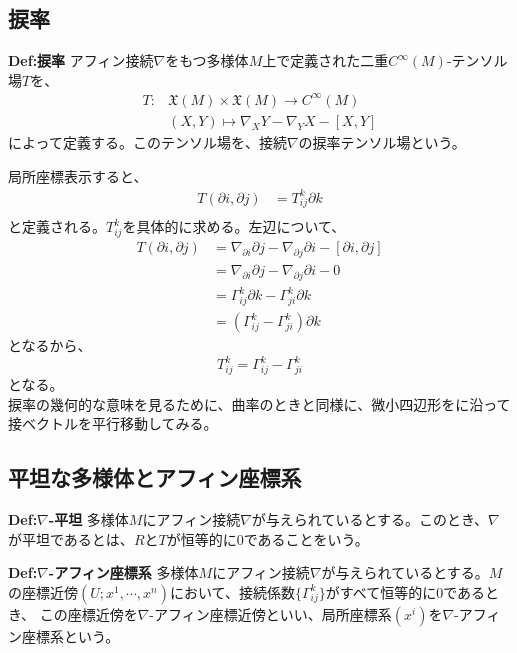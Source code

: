 \documentclass[a4paper,11pt]{jsarticle}
\numberwithin{equation}{section}
\begin{document}
\subsection{捩率}
\begin{itembox}[l]{\textbf{Def:捩率}}
    アフィン接続$\nabla$をもつ多様体$M$上で定義された二重$C^\infty(M)$-テンソル場$T$を、
    \begin{align}
        T : &\mathfrak{X}(M) \times \mathfrak{X}(M) \to C^\infty(M) \\
        & (X,Y) \mapsto \nabla_XY - \nabla_YX - [X,Y]
    \end{align}
    によって定義する。このテンソル場を、接続$\nabla$の捩率テンソル場という。
\end{itembox}
局所座標表示すると、
\begin{align}
    T(\partial{i},\partial{j}) &= T_{ij}^k\partial{k}\\
\end{align}
と定義される。$T_{ij}^k$を具体的に求める。左辺について、
\begin{align}
    T(\partial{i},\partial{j}) &= \nabla_{\partial{i}}\partial{j} - \nabla_{\partial{j}}\partial{i} - [\partial{i},\partial{j}]\\
    &= \nabla_{\partial{i}}\partial{j} - \nabla_{\partial{j}}\partial{i} - 0\\
    &= \Gamma_{ij}^k\partial{k} - \Gamma_{ji}^k\partial{k}\\
    &= (\Gamma_{ij}^k - \Gamma_{ji}^k)\partial{k}
\end{align}
となるから、
\begin{equation}
    T_{ij}^k = \Gamma_{ij}^k - \Gamma_{ji}^k
\end{equation}
となる。\\
捩率の幾何的な意味を見るために、曲率のときと同様に、微小四辺形をに沿って接ベクトルを平行移動してみる。

\subsection{平坦な多様体とアフィン座標系}
\begin{itembox}[l]{\textbf{Def:$\nabla$-平坦}}
    多様体$M$にアフィン接続$\nabla$が与えられているとする。このとき、$\nabla$が平坦であるとは、$R$と$T$が恒等的に0であることをいう。
\end{itembox}

\begin{itembox}[l]{\textbf{Def:$\nabla$-アフィン座標系}}
    多様体$M$にアフィン接続$\nabla$が与えられているとする。$M$の座標近傍$(U;x^1,\cdots,x^n)$において、接続係数$\{\Gamma_{ij}^k\}$がすべて恒等的に0であるとき、
    この座標近傍を$\nabla$-アフィン座標近傍といい、局所座標系$(x^i)$を$\nabla$-アフィン座標系という。
\end{itembox}
\end{document}
